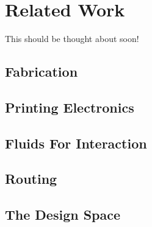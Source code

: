 \section{Related Work}
This should be thought about soon!

\subsection{Fabrication}

\subsection{Printing Electronics}

\subsection{Fluids For Interaction}

\subsection{Routing}

\subsection{The Design Space}

